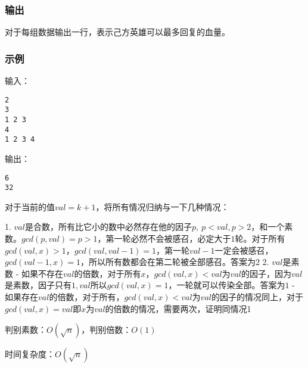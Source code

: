 \subsubsection{输出}
对于每组数据输出一行，表示己方英雄可以最多回复的血量。

\subsubsection{示例}
输入：
\begin{lstlisting}
2
3
1 2 3
4
1 2 3 4
\end{lstlisting}

输出：
\begin{lstlisting}
6
32
\end{lstlisting}

对于当前的值$val = k + 1$，将所有情况归纳与一下几种情况：

1. $val$是合数，所有比它小的数中必然存在他的因子$p, \ p < val, p > 2$，和一个素数。$gcd(p, val) = p > 1$，第一轮必然不会被感召，必定大于$1$轮。对于所有$gcd(val, x) > 1$，$gcd(val, val - 1) = 1$，第一轮$val - 1$一定会被感召，$gcd(val - 1, x) = 1$，所以所有数都会在第二轮被全部感召。答案为$2$
2. $val$是素数
   - 如果不存在$val$的倍数，对于所有$x$，$gcd(val, x)<val$为$val$的因子，因为$val$是素数，因子只有$1, val$所以$gcd(val, x) = 1$，一轮就可以传染全部。答案为$1$
   - 如果存在$val$的倍数，对于所有，$gcd(val, x)<val$为$val$的因子的情况同上，对于$gcd(val, x)=val$即$x$为$val$的倍数的情况，需要两次，证明同情况1​

判别素数：$O(\sqrt{n})$，判别倍数：$O(1)$

时间复杂度：$O(\sqrt{n})$
